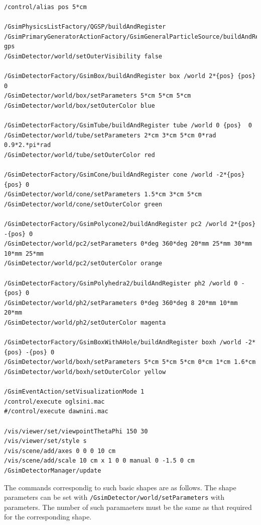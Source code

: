\documentclass[a4paper,12pt]{article}
\begin{document}
 \begin{screen}\scriptsize
  \begin{verbatim}
/control/alias pos 5*cm

/GsimPhysicsListFactory/QGSP/buildAndRegister
/GsimPrimaryGeneratorActionFactory/GsimGeneralParticleSource/buildAndRegister gps
/GsimDetector/world/setOuterVisibility false

/GsimDetectorFactory/GsimBox/buildAndRegister box /world 2*{pos} {pos} 0
/GsimDetector/world/box/setParameters 5*cm 5*cm 5*cm
/GsimDetector/world/box/setOuterColor blue

/GsimDetectorFactory/GsimTube/buildAndRegister tube /world 0 {pos}  0
/GsimDetector/world/tube/setParameters 2*cm 3*cm 5*cm 0*rad 0.9*2.*pi*rad
/GsimDetector/world/tube/setOuterColor red

/GsimDetectorFactory/GsimCone/buildAndRegister cone /world -2*{pos} {pos} 0
/GsimDetector/world/cone/setParameters 1.5*cm 3*cm 5*cm
/GsimDetector/world/cone/setOuterColor green

/GsimDetectorFactory/GsimPolycone2/buildAndRegister pc2 /world 2*{pos} -{pos} 0
/GsimDetector/world/pc2/setParameters 0*deg 360*deg 20*mm 25*mm 30*mm 10*mm 25*mm
/GsimDetector/world/pc2/setOuterColor orange

/GsimDetectorFactory/GsimPolyhedra2/buildAndRegister ph2 /world 0 -{pos} 0
/GsimDetector/world/ph2/setParameters 0*deg 360*deg 8 20*mm 10*mm 20*mm
/GsimDetector/world/ph2/setOuterColor magenta

/GsimDetectorFactory/GsimBoxWithAHole/buildAndRegister boxh /world -2*{pos} -{pos} 0
/GsimDetector/world/boxh/setParameters 5*cm 5*cm 5*cm 0*cm 1*cm 1.6*cm
/GsimDetector/world/boxh/setOuterColor yellow

/GsimEventAction/setVisualizationMode 1
/control/execute oglsini.mac
#/control/execute dawnini.mac

/vis/viewer/set/viewpointThetaPhi 150 30
/vis/viewer/set/style s
/vis/scene/add/axes 0 0 0 10 cm
/vis/scene/add/scale 10 cm x 1 0 0 manual 0 -1.5 0 cm
/GsimDetectorManager/update\end{verbatim}
 \end{screen}
  The commands correspondig to such basic shapes are as follows.
  The shape parameters can be set with
  {\tt /GsimDetector/world/setParameters} with parameters.
  The number of such paramaeters must be the same as that required for
  the corresponding shape.
\end{document}
